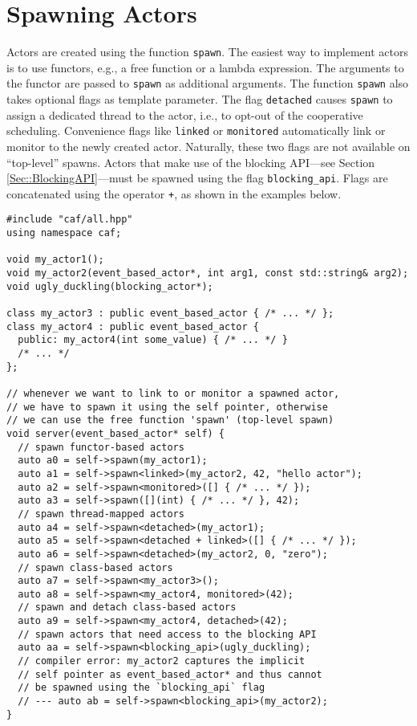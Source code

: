 \section{Spawning Actors}

Actors are created using the function \lstinline^spawn^.
The easiest way to implement actors is to use functors, e.g., a free function or a lambda expression.
The arguments to the functor are passed to \lstinline^spawn^ as additional arguments.
The function \lstinline^spawn^ also takes optional flags as template parameter.
The flag \lstinline^detached^ causes \lstinline^spawn^ to assign a dedicated thread to the actor, i.e., to opt-out of the cooperative scheduling.
Convenience flags like \lstinline^linked^ or \lstinline^monitored^ automatically link or monitor to the newly created actor.
Naturally, these two flags are not available on ``top-level'' spawns.
Actors that make use of the blocking API---see Section \ref{Sec::BlockingAPI}---must be spawned using the flag \lstinline^blocking_api^.
Flags are concatenated using the operator \lstinline^+^, as shown in the examples below.

\begin{lstlisting}
#include "caf/all.hpp"
using namespace caf;

void my_actor1();
void my_actor2(event_based_actor*, int arg1, const std::string& arg2);
void ugly_duckling(blocking_actor*);

class my_actor3 : public event_based_actor { /* ... */ };
class my_actor4 : public event_based_actor {
  public: my_actor4(int some_value) { /* ... */ }
  /* ... */
};

// whenever we want to link to or monitor a spawned actor,
// we have to spawn it using the self pointer, otherwise
// we can use the free function 'spawn' (top-level spawn)
void server(event_based_actor* self) {
  // spawn functor-based actors
  auto a0 = self->spawn(my_actor1);
  auto a1 = self->spawn<linked>(my_actor2, 42, "hello actor");
  auto a2 = self->spawn<monitored>([] { /* ... */ });
  auto a3 = self->spawn([](int) { /* ... */ }, 42);
  // spawn thread-mapped actors
  auto a4 = self->spawn<detached>(my_actor1);
  auto a5 = self->spawn<detached + linked>([] { /* ... */ });
  auto a6 = self->spawn<detached>(my_actor2, 0, "zero");
  // spawn class-based actors
  auto a7 = self->spawn<my_actor3>();
  auto a8 = self->spawn<my_actor4, monitored>(42);
  // spawn and detach class-based actors
  auto a9 = self->spawn<my_actor4, detached>(42);
  // spawn actors that need access to the blocking API
  auto aa = self->spawn<blocking_api>(ugly_duckling);
  // compiler error: my_actor2 captures the implicit
  // self pointer as event_based_actor* and thus cannot
  // be spawned using the `blocking_api` flag
  // --- auto ab = self->spawn<blocking_api>(my_actor2);
}
\end{lstlisting}

